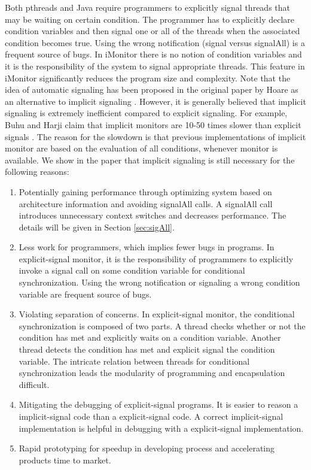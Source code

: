 \documentclass[preprint]{sigplanconf}
\begin{document}
Both pthreads and Java require programmers to explicitly
signal threads that may be waiting on certain condition. The programmer
has to explicitly declare condition variables and then signal one
or all of the threads when the associated condition becomes true.
Using the wrong notification (signal versus signalAll) is a frequent
source of bugs. In iMonitor there is no notion of condition variables
and it is the responsibility of the system to signal appropriate threads.
This feature in iMonitor significantly reduces the program size and complexity.
Note that the idea of automatic signaling has been proposed 
in the original paper by Hoare as an alternative to implicit
signaling \cite{hoa74}. However, it is generally believed that implicit 
signaling is extremely inefficient compared to explicit signaling. 
For example, Buhu and Harji claim that implicit monitors are 10-50 times
slower than explicit signals \cite{bfc95}. The reason for the slowdown is that
previous implementations of implicit monitor are based on the
evaluation of all conditions, whenever monitor is available. 
We show in the paper that implicit signaling is still necessary for the 
following reasons:
\begin{enumerate}
    \item Potentially gaining performance through optimizing system based on
        architecture information and avoiding signalAll calls. A signalAll 
        call introduces unnecessary context switches and decreases performance. 
        The details will be given in Section \ref{sec:sigAll}.
    \item Less work for programmers, which implies fewer bugs in programs.
        In explicit-signal monitor, it is the responsibility of programmers to 
        explicitly invoke a signal call on some condition variable for
        conditional synchronization. Using the wrong notification or signaling
        a wrong condition variable are frequent source of bugs. 
    \item Violating separation of concerns. In explicit-signal monitor, the
        conditional synchronization is composed of two parts. A thread checks
        whether or not the condition has met and explicitly waits on a
        condition variable. Another thread detects the condition has met and
        explicit signal the condition variable. The intricate relation between
        threads for conditional synchronization leads the modularity of 
        programming and encapsulation difficult.  
    \item Mitigating the debugging of explicit-signal programs. It is easier to
        reason a implicit-signal code than a explicit-signal code. A correct
        implicit-signal implementation is helpful in debugging with a 
        explicit-signal implementation.  
    \item Rapid prototyping for speedup in developing process and accelerating
        products time to market.
\end{enumerate}
\end{document}
